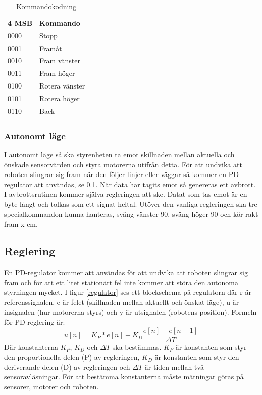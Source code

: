 \begin{table}[h] 
        \label{kodning}
        \begin{tabular}{l l}
                \textbf{4 MSB} & \textbf{Kommando} \\
                0000 & Stopp \\
                0001 & Framåt \\
                0010 & Fram vänster \\
                0011 & Fram höger \\
                0100 & Rotera vänster \\
                0101 & Rotera höger \\
                0110 & Back \\
        \end{tabular}
        \caption{Kommandokodning}
\end{table}

\subsubsection{Autonomt läge}
I autonomt läge så ska styrenheten ta emot skillnaden mellan aktuella och önskade sensorvärden och styra motorerna utifrån detta.
För att undvika att roboten slingrar sig fram när den följer linjer eller väggar så kommer en PD-regulator att användas, se \ref{reglering}.
När data har tagits emot så genereras ett avbrott. I avbrottsrutinen kommer själva regleringen att ske. Datat som tas emot är en byte långt 
och tolkas som ett signat heltal. Utöver den vanliga regleringen ska tre specialkommandon kunna hanteras, sväng vänster 90\degree, sväng höger 90\degree
och kör rakt fram x cm.

\subsection{Reglering}
\label{reglering}
En PD-regulator kommer att användas för att undvika att roboten slingrar sig fram och för att ett litet stationärt fel inte kommer att störa
den autonoma styrningen mycket. I figur \ref{regulator} ses ett blockschema på regulatorn där r är referenssignalen,
e är felet (skillnaden mellan aktuellt och önskat läge), u är insignalen (hur motorerna styrs) och y är utsignalen (robotens position).
Formeln för PD-reglering är: $$ u[n] = K_P*e[n] + K_D\frac{e[n]-e[n-1]}{\Delta T}$$
Där konstanterna $K_P$, $K_D$ och $\Delta T$ ska bestämmas. $K_P$ är konstanten som styr den proportionella delen (P) av regleringen, 
$K_D$ är konstanten som styr den deriverande delen (D) av regleringen och $\Delta T$ är tiden mellan två sensoravläsningar. 
För att bestämma konstanterna måste mätningar göras på sensorer, motorer och roboten.

